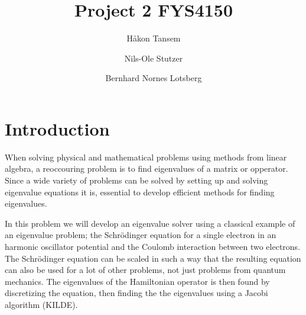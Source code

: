 \documentclass[twocolumn]{aastex62}
\begin{document}
\title{Project 2 FYS4150}




\author{Håkon Tansem}

\author{Nils-Ole Stutzer}

\author{Bernhard Nornes Lotsberg}

\begin{abstract}

\end{abstract}

\section{Introduction} \label{sec:intro}
When solving physical and mathematical problems using methods from linear algebra, a reoccouring problem is to find eigenvalues of a matrix or opperator. Since a wide variety of problems can be solved by setting up and solving eigenvalue equations it is, essential to develop efficient methods for finding eigenvalues. 

In this problem we will develop an eigenvalue solver using a classical example of an eigenvalue problem; the Schrödinger equation for a single electron in an harmonic oscillator potential and the Coulomb interaction between two electrons. The Schrödinger equation can be scaled in such a way that the resulting equation can also be used for a lot of other problems, not just problems from quantum mechanics. The eigenvalues of the Hamiltonian operator is then found by discretizing the equation, then finding the the eigenvalues using a Jacobi algorithm (KILDE).
\end{document}
